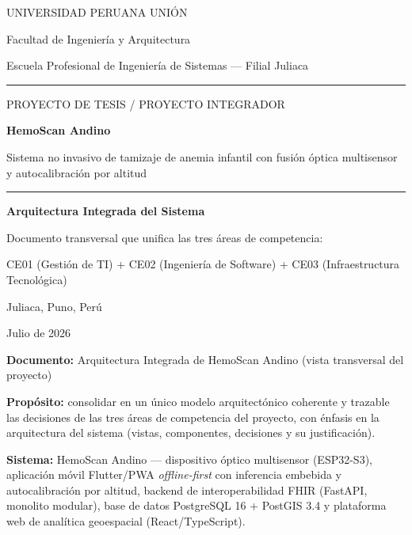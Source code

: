 \documentclass[11pt,a4paper]{article}
\begin{document}
\begin{titlepage}
\centering
\vspace*{1.2cm}
{\large UNIVERSIDAD PERUANA UNI\'ON\par}
{\normalsize Facultad de Ingenier\'ia y Arquitectura\par}
{\normalsize Escuela Profesional de Ingenier\'ia de Sistemas --- Filial Juliaca\par}
\vspace{0.5cm}
\rule{0.6\linewidth}{0.4pt}
\vspace{1.6cm}

{\large PROYECTO DE TESIS / PROYECTO INTEGRADOR\par}
\vspace{1.0cm}
{\huge\bfseries HemoScan Andino\par}
\vspace{0.6cm}
{\Large Sistema no invasivo de tamizaje de anemia infantil con fusi\'on \'optica multisensor y autocalibraci\'on por altitud\par}
\vspace{1.6cm}
\rule{0.6\linewidth}{0.4pt}
\vspace{1.6cm}

{\Large\bfseries Arquitectura Integrada del Sistema\par}
\vspace{0.5cm}
{\normalsize Documento transversal que unifica las tres \'areas de competencia:\par}
{\normalsize CE01 (Gesti\'on de TI) + CE02 (Ingenier\'ia de Software) + CE03 (Infraestructura Tecnol\'ogica)\par}
\vspace{2.0cm}

{\normalsize Juliaca, Puno, Per\'u \par}
{\normalsize Julio de 2026\par}
\vfill
\end{titlepage}

\tableofcontents
\newpage

\textbf{Documento:} Arquitectura Integrada de HemoScan Andino (vista transversal del proyecto)

\textbf{Prop\'osito:} consolidar en un \'unico modelo arquitect\'onico coherente y trazable las decisiones de las tres \'areas de competencia del proyecto, con \'enfasis en la arquitectura del sistema (vistas, componentes, decisiones y su justificaci\'on).

\textbf{Sistema:} HemoScan Andino --- dispositivo \'optico multisensor (ESP32-S3), aplicaci\'on m\'ovil Flutter/PWA \emph{offline-first} con inferencia embebida y autocalibraci\'on por altitud, backend de interoperabilidad FHIR (FastAPI, monolito modular), base de datos PostgreSQL 16 + PostGIS 3.4 y plataforma web de anal\'itica geoespacial (React/TypeScript).
\end{document}
